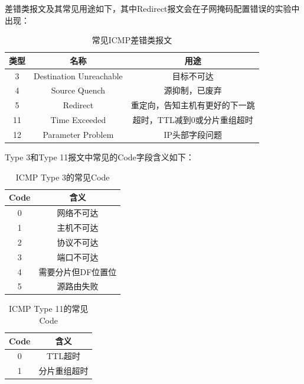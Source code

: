 差错类报文及其常见用途如下，其中Redirect报文会在子网掩码配置错误的实验中出现：
\begin{table}[htbp]
    \centering
    \caption{常见ICMP差错类报文}
    \label{tab:icmp-error-types}
    \begin{tabular}{ccc}
        \toprule
        类型 & 名称 & 用途 \\
        \midrule
        3  & Destination Unreachable & 目标不可达 \\
        4  & Source Quench & 源抑制，已废弃 \\
        5  & Redirect & 重定向，告知主机有更好的下一跳 \\
        11 & Time Exceeded & 超时，TTL减到0或分片重组超时 \\
        12 & Parameter Problem & IP头部字段问题 \\
        \bottomrule
    \end{tabular}
\end{table}

Type 3和Type 11报文中常见的Code字段含义如下：
\begin{table}[htbp]
    \centering
    \caption{ICMP Type 3的常见Code}
    \label{tab:icmp-type3-code}
    \begin{tabular}{cc}
        \toprule
        Code & 含义 \\
        \midrule
        0 & 网络不可达 \\
        1 & 主机不可达 \\
        2 & 协议不可达 \\
        3 & 端口不可达 \\
        4 & 需要分片但DF位置位 \\
        5 & 源路由失败 \\
        \bottomrule
    \end{tabular}
\end{table}

\begin{table}[htbp]
    \centering
    \caption{ICMP Type 11的常见Code}
    \label{tab:icmp-type11-code}
    \begin{tabular}{cc}
        \toprule
        Code & 含义 \\
        \midrule
        0 & TTL超时 \\
        1 & 分片重组超时 \\
        \bottomrule
    \end{tabular}
\end{table}

